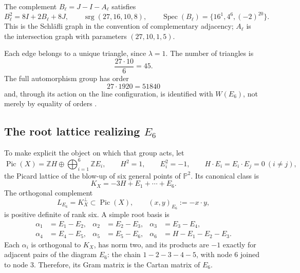 The complement \(B_\ell=J-I-A_\ell\) satisfies
\begin{equation}
 B_\ell^2=8I+2B_\ell+8J,
 \qquad
 \operatorname{srg}(27,16,10,8),
 \qquad
 \operatorname{Spec}(B_\ell)=\{16^1,4^6,(-2)^{20}\}.
 \label{p12-83-c20-s6:eq:complemento-schlafli}
\end{equation}
This is the Schläfli graph in the convention of complementary adjacency;
\(A_\ell\) is the intersection graph with parameters
\((27,10,1,5)\).

Each edge belongs to a unique triangle, since \(\lambda=1\). The number
of triangles is
\[
 \frac{27\cdot10}{6}=45.
\]
The full automorphism group has order
\[
 27\cdot1920=51840
\]
and, through its action on the line configuration, is identified with
\(W(E_6)\), not merely by equality of orders \cite{Manivel2005}.

\subsection{The root lattice realizing \texorpdfstring{\(E_6\)}{E6}}

To make explicit the object on which that group acts, let
\begin{equation}
 \operatorname{Pic}(X)
 =\mathbb ZH\oplus\bigoplus_{i=1}^6\mathbb ZE_i,
 \qquad
 H^2=1,\qquad E_i^2=-1,\qquad H\cdot E_i=E_i\cdot E_j=0\ (i\ne j),
 \label{p12-83-c20-s6:eq:picard-cubica-e6}
\end{equation}
the Picard lattice of the blow-up of six general points of
\(\mathbb P^2\). Its canonical class is
\[
 K_X=-3H+E_1+\cdots+E_6.
\]
The orthogonal complement
\begin{equation}
 L_{E_6}=K_X^\perp\subset\operatorname{Pic}(X),
 \qquad (x,y)_{E_6}:=-x\cdot y,
 \label{p12-83-c20-s6:eq:reticulo-raices-e6}
\end{equation}
is positive definite of rank six. A simple root basis is
\begin{equation}
 \begin{aligned}
 \alpha_1&=E_1-E_2,& \alpha_2&=E_2-E_3,&
 \alpha_3&=E_3-E_4,\\
 \alpha_4&=E_4-E_5,& \alpha_5&=E_5-E_6,&
 \alpha_6&=H-E_1-E_2-E_3.
 \end{aligned}
 \label{p12-83-c20-s6:eq:raices-simples-e6}
\end{equation}
Each \(\alpha_i\) is orthogonal to \(K_X\), has norm two, and its products
are \(-1\) exactly for adjacent pairs of the diagram
\(E_6\): the chain \(1-2-3-4-5\), with node \(6\) joined to node \(3\).
Therefore, its Gram matrix is the Cartan matrix of \(E_6\).

